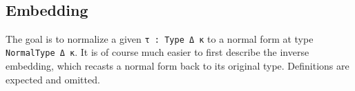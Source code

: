 \documentclass[authoryear, acmsmall, screen, review, nonacm]{acmart} %
\begin{document}
\begin{code}[hide]
\>[0]\AgdaSpace{}%
\AgdaSymbol{:}\AgdaSpace{}%
\AgdaSpace{}%
\AgdaSpace{}%
\AgdaOperator{\AgdaInductiveConstructor{R[}}\AgdaSpace{}%
\AgdaSpace{}%
\AgdaOperator{\AgdaInductiveConstructor{]}}\AgdaSpace{}%
\AgdaSpace{}%
\AgdaSpace{}%
\AgdaSymbol{(}\AgdaSpace{}%
\AgdaOperator{\AgdaInductiveConstructor{,,}}\AgdaSpace{}%
\AgdaSymbol{)}\AgdaSpace{}%
\AgdaOperator{\AgdaInductiveConstructor{R[}}\AgdaSpace{}%
\AgdaSpace{}%
\AgdaOperator{\AgdaInductiveConstructor{]}}\<%
\\
\>[0]\AgdaSpace{}%
\AgdaSymbol{=}\AgdaSpace{}%
\AgdaSpace{}%
\<%
\end{code}

\subsection{Embedding}

The goal is to normalize a given \verb!τ : Type Δ κ! to a normal form at type \verb!NormalType Δ κ!. It is of course much easier to first describe the inverse embedding, which recasts a normal form back to its original type. Definitions are expected and omitted. 
\end{document}
